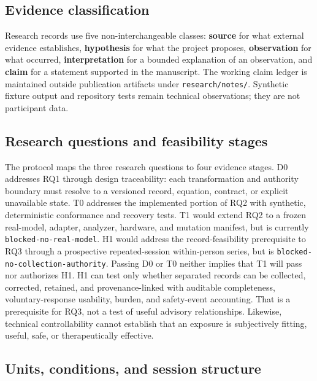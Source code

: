 \subsection{Evidence classification}
\label{sec:evidence-classification}

Research records use five non-interchangeable classes: \textbf{source} for what
external evidence establishes, \textbf{hypothesis} for what the project proposes,
\textbf{observation} for what occurred, \textbf{interpretation} for a bounded
explanation of an observation, and \textbf{claim} for a statement supported in
the manuscript. The working claim ledger is maintained outside publication
artifacts under \texttt{research/notes/}. Synthetic fixture output and repository
tests remain technical observations; they are not participant data.

\subsection{Research questions and feasibility stages}
\label{sec:methods-feasibility-stages}

The protocol maps the three research questions to four evidence stages. D0
addresses RQ1 through design traceability: each transformation and authority
boundary must resolve to a versioned record, equation, contract, or explicit
unavailable state. T0 addresses the implemented portion of RQ2 with synthetic,
deterministic conformance and recovery tests. T1 would extend RQ2 to a frozen
real-model, adapter, analyzer, hardware, and mutation manifest, but is currently
\texttt{blocked-no-real-model}. H1 would address the record-feasibility
prerequisite to RQ3 through a prospective
repeated-session within-person series, but is
\texttt{blocked-no-collection-authority}. Passing D0 or T0 neither implies that
T1 will pass nor authorizes H1. H1 can test only whether separated records can
be collected, corrected, retained, and provenance-linked with auditable
completeness, voluntary-response usability, burden, and safety-event accounting.
That is a prerequisite for RQ3, not a test of useful advisory relationships.
Likewise, technical controllability cannot establish that an exposure is
subjectively fitting, useful, safe, or therapeutically effective.

\subsection{Units, conditions, and session structure}
\label{sec:methods-session-structure}

